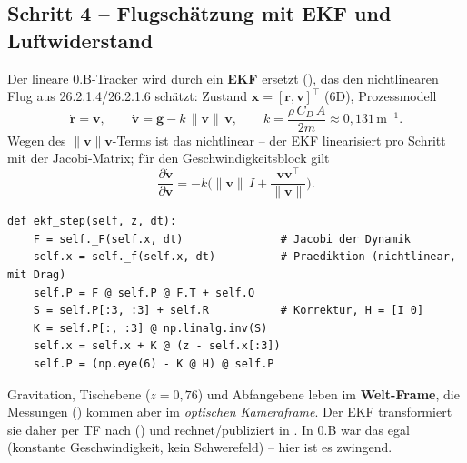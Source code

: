 \subsection{Schritt 4 -- Flugschätzung mit EKF und Luftwiderstand}
Der lineare 0.B-Tracker wird durch ein \textbf{EKF} ersetzt
(), das den nichtlinearen Flug aus 26.2.1.4/26.2.1.6 schätzt:
Zustand $\mathbf{x}=[\mathbf{r},\mathbf{v}]^\top$ (6D), Prozessmodell
\begin{equation}
\dot{\mathbf r}=\mathbf v,\qquad
\dot{\mathbf v}=\mathbf g-k\,\lVert\mathbf v\rVert\,\mathbf v,\qquad
k=\frac{\rho\,C_D\,A}{2m}\approx0{,}131\,\mathrm{m^{-1}}.
\end{equation}
Wegen des $\lVert\mathbf v\rVert\mathbf v$-Terms ist das nichtlinear -- der EKF
linearisiert pro Schritt mit der Jacobi-Matrix; für den Geschwindigkeitsblock gilt
\begin{equation}
\frac{\partial \dot{\mathbf v}}{\partial \mathbf v}
= -k\Big(\lVert\mathbf v\rVert\,I+\frac{\mathbf v\mathbf v^\top}{\lVert\mathbf v\rVert}\Big).
\end{equation}
\begin{lstlisting}[style=py,caption={\code{flight\_ekf} -- EKF-Kern (Position gemessen, H=[I\ 0])}]
def ekf_step(self, z, dt):
    F = self._F(self.x, dt)               # Jacobi der Dynamik
    self.x = self._f(self.x, dt)          # Praediktion (nichtlinear, mit Drag)
    self.P = F @ self.P @ F.T + self.Q
    S = self.P[:3, :3] + self.R           # Korrektur, H = [I 0]
    K = self.P[:, :3] @ np.linalg.inv(S)
    self.x = self.x + K @ (z - self.x[:3])
    self.P = (np.eye(6) - K @ H) @ self.P
\end{lstlisting}

\begin{warnbox}[title={Physik im Welt-Frame -- Messungen per TF transformieren}]
Gravitation, Tischebene ($z=0{,}76$) und Abfangebene leben im \textbf{Welt-Frame},
die Messungen () kommen aber im \emph{optischen Kameraframe}.
Der EKF transformiert sie daher per TF nach 
() und rechnet/publiziert in .
In 0.B war das egal (konstante Geschwindigkeit, kein Schwerefeld) -- hier ist es
zwingend.
\end{warnbox}

